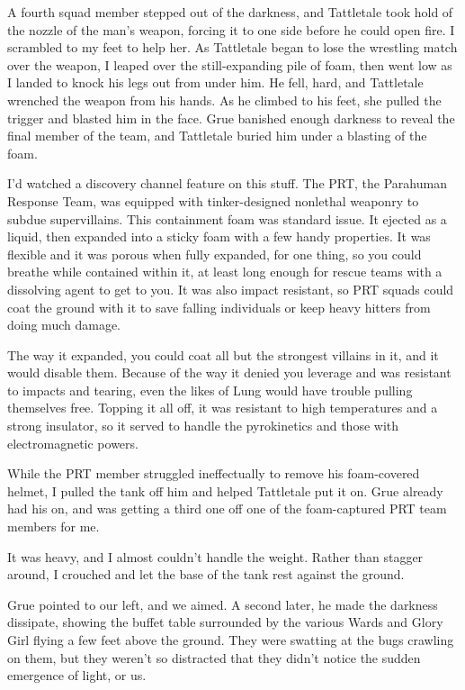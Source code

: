 A fourth squad member stepped out of the darkness, and Tattletale took hold of the nozzle of the man's weapon, forcing it to one side before he could open fire.  I scrambled to my feet to help her.  As Tattletale began to lose the wrestling match over the weapon, I leaped over the still-expanding pile of foam, then went low as I landed to knock his legs out from under him.  He fell, hard, and Tattletale wrenched the weapon from his hands.  As he climbed to his feet, she pulled the trigger and blasted him in the face.  Grue banished enough darkness to reveal the final member of the team, and Tattletale buried him under a blasting of the foam.



I'd watched a discovery channel feature on this stuff.  The PRT, the Parahuman Response Team, was equipped with tinker-designed nonlethal weaponry to subdue supervillains.  This containment foam was standard issue.  It ejected as a liquid, then expanded into a sticky foam with a few handy properties.  It was flexible and it was porous when fully expanded, for one thing, so you could breathe while contained within it, at least long enough for rescue teams with a dissolving agent to get to you.  It was also impact resistant, so PRT squads could coat the ground with it to save falling individuals or keep heavy hitters from doing much damage.



The way it expanded, you could coat all but the strongest villains in it, and it would disable them.  Because of the way it denied you leverage and was resistant to impacts and tearing, even the likes of Lung would have trouble pulling themselves free.  Topping it all off, it was resistant to high temperatures and a strong insulator, so it served to handle the pyrokinetics and those with electromagnetic powers.



While the PRT member struggled ineffectually to remove his foam-covered helmet, I pulled the tank off him and helped Tattletale put it on.  Grue already had his on, and was getting a third one off one of the foam-captured PRT team members for me.



It was heavy, and I almost couldn't handle the weight.  Rather than stagger around, I crouched and let the base of the tank rest against the ground.



Grue pointed to our left, and we aimed.  A second later, he made the darkness dissipate, showing the buffet table surrounded by the various Wards and Glory Girl flying a few feet above the ground.  They were swatting at the bugs crawling on them, but they weren't so distracted that they didn't notice the sudden emergence of light, or us.



